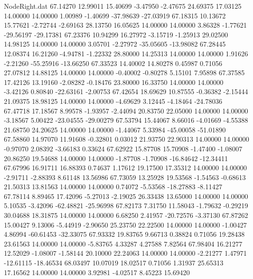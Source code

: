 \begin{filecontents}{NodeRight.dat}
  67.14270   12.99011   15.40699    -3.47950   -2.47675   24.69375   17.03125   14.00000   14.00000    1.00989   -1.40699  -37.98639  -27.03919
  67.18315   10.13672   15.77621    -2.72744   -2.69163   28.13750   16.05625   14.00000   14.00000    3.86328   -1.77621  -29.56197  -29.17381
  67.23376   10.94299   16.27972    -3.15719   -1.25913   29.02500   14.98125   14.00000   14.00000    3.05701   -2.27972  -35.05605  -13.98082
  67.28445   12.08374   16.21260    -4.94781   -1.22332   28.80000   14.25313   14.00000   14.00000    1.91626   -2.21260  -55.25916  -13.66250
  67.33523   14.40002   14.80278     0.45987    0.71056   27.07812   14.88125   14.00000   14.00000   -0.40002   -0.80278    5.15101    7.95898
  67.37585   17.42126   13.19160    -2.08282   -0.18476   23.80000   16.33750   14.00000   14.00000   -3.42126    0.80840  -22.63161   -2.00753
  67.42654   18.69629   10.87555    -0.36382   -2.15444   21.09375   18.98125   14.00000   14.00000   -4.69629    3.12445   -4.18464  -24.78036
  67.47718   17.18567    8.99578    -1.93957   -2.44094   20.83750   22.05000   14.00000   14.00000   -3.18567    5.00422  -23.04555  -29.00279
  67.53794   15.44067    8.66016    -4.01669   -4.55388   21.68750   24.20625   14.00000   14.00000   -1.44067    5.33984  -45.00058  -51.01890
  67.58860   14.97070   11.91608    -0.32801    0.03012   21.93750   22.90313   14.00000   14.00000   -0.97070    2.08392   -3.66183    0.33624
  67.62922   15.87708   15.70908    -1.47400   -1.08007   20.86250   19.54688   14.00000   14.00000   -1.87708   -1.70908  -16.84642  -12.34411
  67.67996   16.91711   16.88393     0.74637    1.17612   19.17500   17.35312   14.00000   14.00000   -2.91711   -2.88393    8.61148   13.56986
  67.73059   13.25928   19.53568    -1.54563   -0.68613   21.50313   13.81563   14.00000   14.00000    0.74072   -5.53568  -18.27883   -8.11427
  67.78114    8.89465   17.42096    -5.27013   -2.19025   26.33438   13.65000   14.00000   14.00000    5.10535   -3.42096  -62.48821  -25.96998
  67.82173    7.31750   11.58043    -1.79632   -0.29219   30.04688   18.31875   14.00000   14.00000    6.68250    2.41957  -20.72576   -3.37130
  67.87262   15.00427    9.13006    -5.44919   -2.90650   25.23750   22.22500   14.00000   14.00000   -1.00427    4.86994  -60.61453  -32.33075
  67.93332   19.83765    9.66713     0.38824    0.71056   19.28438   23.61563   14.00000   14.00000   -5.83765    4.33287    4.27588    7.82564
  67.98404   16.21277   12.52029    -1.08007   -1.58144   20.10000   22.24063   14.00000   14.00000   -2.21277    1.47971  -12.61115  -18.46534
  68.03497   10.07019   18.02517     0.71056    1.31937   25.65313   17.16562   14.00000   14.00000    3.92981   -4.02517    8.45223   15.69420

\end{filecontents}
